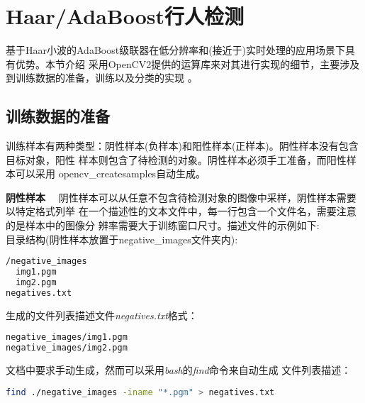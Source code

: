 \section{Haar/AdaBoost行人检测}
基于Haar小波的AdaBoost级联器\cite{haar}在低分辨率和(接近于)实时处理的应用场景下具有优势。本节介绍
采用OpenCV2提供的运算库来对其进行实现的细节，主要涉及到训练数据的准备，训练以及分类的实现
。
\subsection{训练数据的准备}
训练样本有两种类型：阴性样本(负样本)和阳性样本(正样本)。阴性样本没有包含目标对象，阳性
样本则包含了待检测的对象。阴性样本必须手工准备，而阳性样本可以采用
\textsf{opencv\_createsamples}自动生成。

\textbf{阴性样本}~~
阴性样本可以从任意不包含待检测对象的图像中采样，阴性样本需要以特定格式列举
在一个描述性的文本文件中，每一行包含一个文件名，需要注意的是样本中的图像分
辨率需要大于训练窗口尺寸。描述文件的示例如下:\\
目录结构(阴性样本放置于\textsf{negative\_images}文件夹内):
\begin{lstlisting}[language=bash]
/negative_images
  img1.pgm
  img2.pgm
negatives.txt
\end{lstlisting}
生成的文件列表描述文件\textit{negatives.txt}格式：
\begin{lstlisting}[language=bash]
negative_images/img1.pgm
negative_images/img2.pgm
\end{lstlisting}
文档中要求手动生成，然而可以采用\textit{bash}的\textit{find}命令来自动生成
文件列表描述：
\begin{lstlisting}[language=bash]
find ./negative_images -iname "*.pgm" > negatives.txt
\end{lstlisting}

